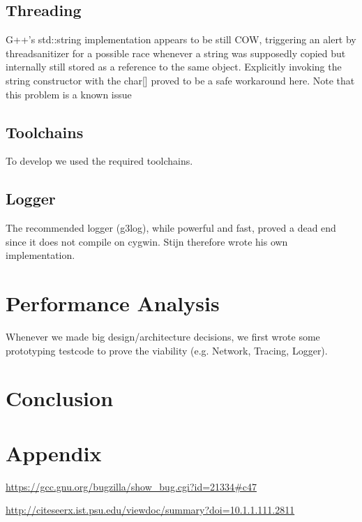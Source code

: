 \documentclass[8pt,a4paper]{report}
\begin{document}
\section{Threading}
G++'s std::string implementation appears to be still COW, triggering an alert by threadsanitizer for a possible race whenever a string was supposedly copied but internally still stored as a reference to the same object. Explicitly invoking the string constructor with the char[] proved to be a safe workaround here. Note that this problem is a known issue \cite{cow}
\section{Toolchains}
To develop we used the required toolchains. 
\section{Logger}
The recommended logger (g3log), while powerful and fast, proved a dead end since it does not compile on cygwin. 
Stijn therefore wrote his own implementation. %
\chapter{Performance Analysis}
Whenever we made big design/architecture decisions, we first wrote some prototyping testcode to prove the viability (e.g. Network, Tracing, Logger).
\chapter{Conclusion}

\chapter{Appendix}

\begin{thebibliography}{1}


   \url{https://gcc.gnu.org/bugzilla/show_bug.cgi?id=21334#c47}

   \url{http://citeseerx.ist.psu.edu/viewdoc/summary?doi=10.1.1.111.2811}

  \end{thebibliography}
\end{document}
